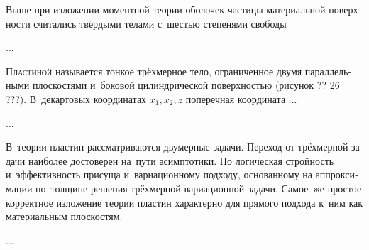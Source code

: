 \begin{otherlanguage}{russian}


\noindent Выше при изложении моментной теории оболочек частицы материальной поверхности считались твёрдыми телами с~шестью степенями свободы

...



\end{otherlanguage}



\label{para:overviewofplates}

\begin{otherlanguage}{russian}

\lettrine[lines=2, findent=2pt, nindent=0pt]{П}{ластиной} называется тонкое трёхмерное тело, ограниченное двумя параллельными плоскостями и~боковой цилиндрической поверхностью (рисунок ?? 26 ???). В~декартовых координатах ${x_1, x_2, z}$ поперечная координата ...

...

В~теории пластин рассматриваются двумерные задачи. Переход от трёхмерной задачи наиболее достоверен на~пути асимптотики. Но логическая стройность и~эффективность присуща и~вариационному подходу, основанному на аппроксимации по~толщине решения трёхмерной вариационной задачи. Самое~же простое корректное изложение теории пластин характерно для прямого подхода к~ним как материальным плоскостям.

...



\end{otherlanguage}



